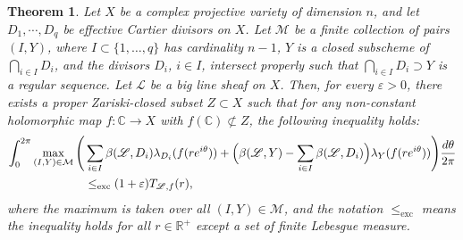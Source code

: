\documentclass[10pt,a4paper]{amsart}
\newtheorem{theorem}{Theorem}
\begin{document}
 \begin{theorem}\label{trungeneral}
    Let $X$ be a complex projective variety of dimension $n$, and let $D_1,\cdots,D_q$  be effective Cartier divisors on  $X$.
  Let $\mathcal M$ be a finite collection of pairs $(I,Y)$, where 
$I \subset \{1,\ldots,q\}$ has cardinality $n-1$, $Y$ is a closed subscheme of $\bigcap_{i \in I} D_i$, and the divisors $D_i$, $i \in I$, intersect properly  such that $ \bigcap_{i \in I} D_i\supset Y $
is a  regular sequence. Let $\mathscr L$ be a big line sheaf on $X$.  
 Then, for every $\varepsilon>0$,  there exists a proper  Zariski-closed subset $Z\subset X$ such that for any non-constant holomorphic map $f:\mathbb{C}\to X$ with  $f(\mathbb{C})\not\subset Z$,  the following  inequality  holds:
 \begin{align}\label{mainineq}
\int_0^{2\pi} \max_{(I,Y) \in \mathcal{M}} \Bigg(
&\sum_{i \in I} \beta(\mathscr{L}, D_i)\lambda_{D_i}(f(re^{i\theta}))  
 + \Big( \beta(\mathscr{L}, Y) - \sum_{i \in I} \beta(\mathscr{L}, D_i) \Big) \lambda_Y(f(re^{i\theta}))
\Bigg)   \frac{d\theta}{2\pi}\notag\\
&\leq_{\operatorname{exc}} (1+\varepsilon) T_{\mathscr{L}, f}(r),
\end{align}
where the maximum is taken over all   $(I,Y)\in\mathcal M$, and the notation $\leq_{\operatorname{exc}}$ means the inequality holds for all $r\in \mathbb{R}^+$ except a set of finite Lebesgue measure.
\end{theorem}
\end{document}
